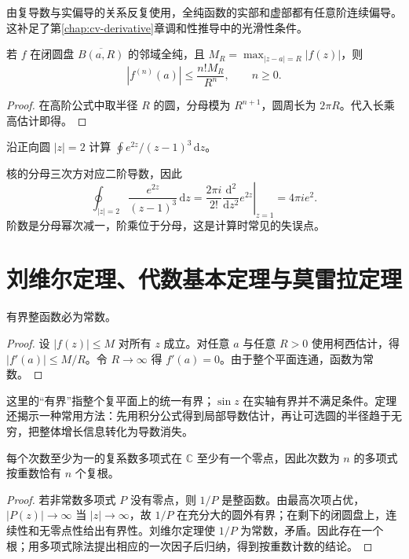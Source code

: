 \documentclass[UTF8,12pt,a4paper,fontset=fandol]{ctexbook}
\begin{document}
由复导数与实偏导的关系反复使用，全纯函数的实部和虚部都有任意阶连续偏导。这补足了第\ref{chap:cv-derivative}章调和性推导中的光滑性条件。

\begin{corollary}[柯西估计]
\label{cor:cv-cauchy-estimate}
若 $f$ 在闭圆盘 $\overline{B(a,R)}$ 的邻域全纯，且 $M_R=\max_{|z-a|=R}|f(z)|$，则
\begin{equation}
 |f^{(n)}(a)|\le\frac{n!M_R}{R^n},\qquad n\ge0.
 \label{eq:cv-cauchy-estimate}
\end{equation}
\end{corollary}
\begin{proof}
在高阶公式中取半径 $R$ 的圆，分母模为 $R^{n+1}$，圆周长为 $2\pi R$。代入长乘高估计即得。
\end{proof}

\begin{example}[高阶核的积分]
沿正向圆 $|z|=2$ 计算 $\oint e^{2z}/(z-1)^3\,\mathrm dz$。
\end{example}
\begin{solve}
核的分母三次方对应二阶导数，因此
\[
 \oint_{|z|=2}\frac{e^{2z}}{(z-1)^3}\,\mathrm dz
 =\frac{2\pi i}{2!}\left.\frac{\mathrm d^2}{\mathrm dz^2}e^{2z}\right|_{z=1}
 =4\pi i e^2.
\]
阶数是分母幂次减一，阶乘位于分母，这是计算时常见的失误点。
\end{solve}

\section{刘维尔定理、代数基本定理与莫雷拉定理}

\begin{theorem}[刘维尔定理]
\label{thm:cv-liouville}
有界整函数必为常数。
\end{theorem}
\begin{proof}
设 $|f(z)|\le M$ 对所有 $z$ 成立。对任意 $a$ 与任意 $R>0$ 使用柯西估计，得 $|f'(a)|\le M/R$。令 $R\to\infty$ 得 $f'(a)=0$。由于整个平面连通，函数为常数。
\end{proof}

这里的“有界”指整个复平面上的统一有界；$\sin z$ 在实轴有界并不满足条件。定理还揭示一种常用方法：先用积分公式得到局部导数估计，再让可选圆的半径趋于无穷，把整体增长信息转化为导数消失。

\begin{theorem}[代数基本定理]
\label{thm:cv-fta}
每个次数至少为一的复系数多项式在 $\mathbb C$ 至少有一个零点，因此次数为 $n$ 的多项式按重数恰有 $n$ 个复根。
\end{theorem}
\begin{proof}
若非常数多项式 $P$ 没有零点，则 $1/P$ 是整函数。由最高次项占优，$|P(z)|\to\infty$ 当 $|z|\to\infty$，故 $1/P$ 在充分大的圆外有界；在剩下的闭圆盘上，连续性和无零点性给出有界性。刘维尔定理使 $1/P$ 为常数，矛盾。因此存在一个根；用多项式除法提出相应的一次因子后归纳，得到按重数计数的结论。
\end{proof}
\end{document}
